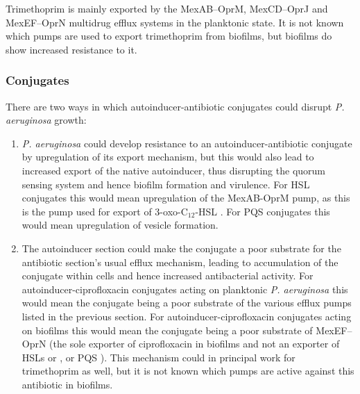 Trimethoprim  is mainly exported by the MexAB–OprM\cite{Kohler1996}, MexCD–OprJ\cite{Poole1996} and MexEF–OprN\cite{Kohler1997} multidrug efflux systems\cite{Poole2001,Poole2004} in the planktonic state. It is not known which pumps are used to export trimethoprim  from biofilms, but biofilms do show increased resistance to it\cite{Olson2002}.

\subsubsection{Conjugates\label{sec:conj_eff}}

There are two ways in which autoinducer-antibiotic conjugates could disrupt \textit{P. aeruginosa} growth:

\begin{enumerate}

\item \textit{P. aeruginosa} could develop resistance to an autoinducer-antibiotic conjugate by upregulation of its export mechanism, but this would also lead to increased export of the native autoinducer, thus disrupting the quorum sensing system and hence biofilm formation and virulence\cite{Dubern2008,Davies1998,Evans1998}.
For HSL conjugates this would mean upregulation of the MexAB-OprM pump, as this is the pump used for export of 3-oxo-C$_{12}$-HSL \cite{Evans1998,Poole2004}.
For PQS conjugates this would mean upregulation of vesicle formation\cite{Florez2017}.

\item The autoinducer section could make the conjugate a poor substrate for the antibiotic section's usual efflux mechanism, leading to accumulation of the conjugate within cells and hence increased antibacterial activity. 
For autoinducer-ciprofloxacin conjugates acting on planktonic \textit{P. aeruginosa} this would mean the conjugate being a poor substrate of the various efflux pumps listed in the previous section.
For autoinducer-ciprofloxacin conjugates acting on biofilms this would mean the conjugate being a poor substrate of MexEF–OprN (the sole exporter of ciprofloxacin  in biofilms\cite{DeKievit2001} and not an exporter of HSLs  or , or PQS \cite{Poole2004}).
This mechanism could in principal work for trimethoprim  as well, but it is not known which pumps are active against this antibiotic in biofilms. 

\end{enumerate}


